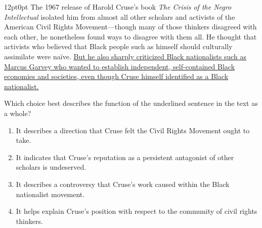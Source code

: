 \documentclass[11pt, twocolumn]{article}
\newcounter{questionnum}
\begin{document}
\vspace{6pt}\noindent
\begin{minipage}{\columnwidth}\raggedright
\noindent{}\par\vspace{8pt}
\begin{adjustwidth}{12pt}{0pt}
The 1967 release of Harold Cruse's book \textit{The Crisis of the Negro Intellectual }isolated him from almost all other scholars and activists of the American Civil Rights Movement---though many of those thinkers disagreed with each other, he nonetheless found ways to disagree with them all. He thought that activists who believed that Black people such as himself should culturally assimilate were naïve. \uline{But he also sharply criticized Black nationalists such as Marcus Garvey who wanted to establish independent, self-contained Black economies and societies, even though Cruse himself identified as a Black nationalist.}
\vspace{6pt}

Which choice best describes the function of the underlined sentence in the text as a whole?
\begin{enumerate}[label=\Alph*),leftmargin=18pt,topsep=3pt,itemsep=2pt]
  \item It describes a direction that Cruse felt the Civil Rights Movement ought to take.
  \item It indicates that Cruse's reputation as a persistent antagonist of other scholars is undeserved.
  \item It describes a controversy that Cruse's work caused within the Black nationalist movement.
  \item It helps explain Cruse's position with respect to the community of civil rights thinkers.
\end{enumerate}
\end{adjustwidth}
\end{minipage}\par
\end{document}
